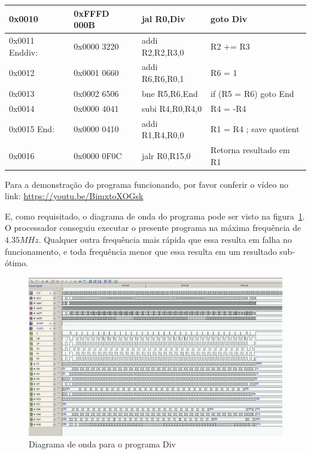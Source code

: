 \documentclass[12pt]{article}
\begin{document}
\begin{table}[H]
\begin{tabular}{|l|l|l|l|}
        0x0010         & 0xFFFD 000B & jal  R0,Div          & goto Div                     \\\hline
        0x0011 Enddiv: & 0x0000 3220 & addi R2,R2,R3,0      & R2 += R3                     \\\hline
        0x0012         & 0x0001 0660 & addi R6,R6,R0,1      & R6 = 1                       \\\hline
        0x0013         & 0x0002 6506 & bne  R5,R6,End       & if (R5 \!= R6) goto End      \\\hline
        0x0014         & 0x0000 4041 & subi R4,R0,R4,0      & R4 = -R4                     \\\hline
        0x0015 End:    & 0x0000 0410 & addi R1,R4,R0,0      & R1 = R4 ; save quotient      \\\hline
        0x0016         & 0x0000 0F0C & jalr R0,R15,0        & Retorna resultado em R1      \\\hline
    \end{tabular}\label{tab:programs:div}
\end{table}

Para a demonstração do programa funcionando, por favor conferir o vídeo no link:
\href{https://youtu.be/BimxtoXOGsk}{https://youtu.be/BimxtoXOGsk}

E, como requisitado, o diagrama de onda do programa pode ser visto na
figura~\ref{fig:program__div_wave.png}. O processador conseguiu executar o
presente programa na máxima frequência de $4.35MHz$. Qualquer outra frequência
mais rápida que essa resulta em falha no funcionamento, e toda frequência menor
que essa resulta em um resultado sub-ótimo.

\begin{figure}[H]
    \centering
    \includegraphics[width=.9\textwidth]{Projeto/images/program__div_wave.png}
    \caption{Diagrama de onda para o programa Div}\label{fig:program__div_wave.png}
\end{figure}
\end{document}
